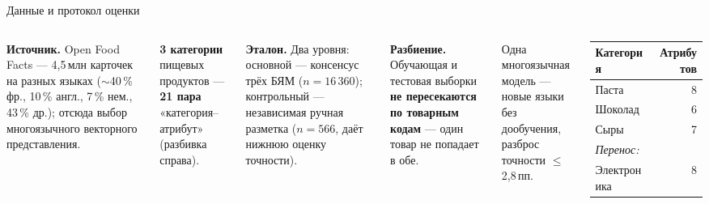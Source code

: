 \documentclass[aspectratio=169, 14pt]{beamer}
\begin{document}
\begin{frame}{Данные и протокол оценки}
\begin{columns}[T]
\fontsize{10pt}{12pt}\selectfont
\textbf{Источник.} Open Food Facts — 4{,}5\,млн карточек на разных языках ($\sim$40\,\% фр., 10\,\% англ., 7\,\% нем., 43\,\% др.); отсюда выбор многоязычного векторного представления.

\vspace{0.4em}
\textbf{3 категории} пищевых продуктов — \textbf{21 пара} «категория--атрибут» (разбивка справа).

\vspace{0.4em}
\textbf{Эталон.} Два уровня: основной — консенсус трёх БЯМ ($n = 16\,360$); контрольный — независимая ручная разметка ($n = 566$, даёт нижнюю оценку точности).

\vspace{0.4em}
\textbf{Разбиение.} Обучающая и тестовая выборки \textbf{не пересекаются по товарным кодам} --- один товар не попадает в обе.

\vspace{0.1em}
\fontsize{9pt}{10.5pt}\selectfont\color{black!65}
Одна многоязычная модель --- новые языки без дообучения, разброс точности $\leq$2{,}8\,пп.

\centering
\fontsize{9pt}{11pt}\selectfont
\setlength{\tabcolsep}{6pt}
\renewcommand{\arraystretch}{1.15}
\begin{tabular}{lr}
\toprule
\textbf{Категория} & \textbf{Атрибутов} \\
\midrule
Паста            & 8 \\
Шоколад          & 6 \\
Сыры             & 7 \\
\midrule
\textit{Перенос:} & \\
Электроника      & 8 \\
\bottomrule
\end{tabular}
\end{columns}
\end{frame}
\end{document}
